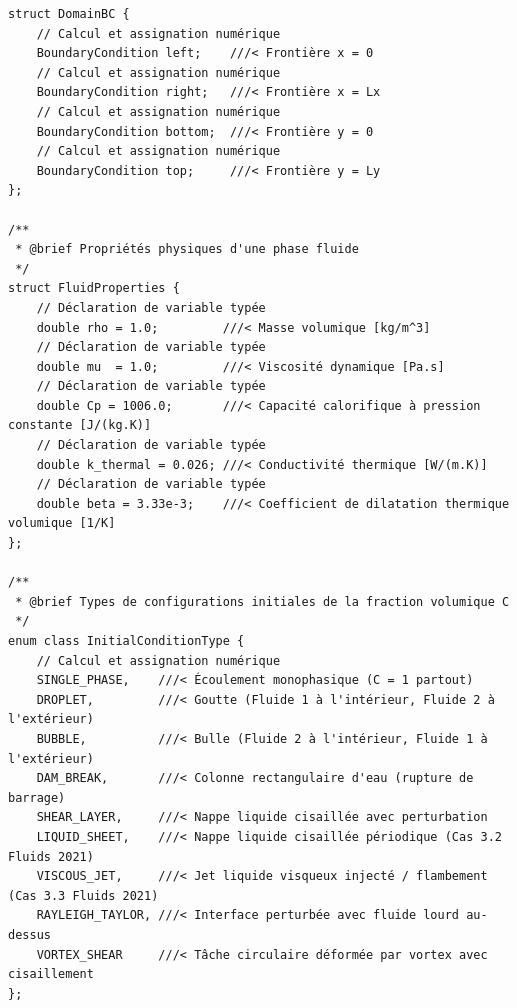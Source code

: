 \documentclass[10pt,a4paper,oneside]{book}
\begin{document}
\begin{lstlisting}[language={[11]C++}]
struct DomainBC {
    // Calcul et assignation numérique
    BoundaryCondition left;    ///< Frontière x = 0
    // Calcul et assignation numérique
    BoundaryCondition right;   ///< Frontière x = Lx
    // Calcul et assignation numérique
    BoundaryCondition bottom;  ///< Frontière y = 0
    // Calcul et assignation numérique
    BoundaryCondition top;     ///< Frontière y = Ly
};

/**
 * @brief Propriétés physiques d'une phase fluide
 */
struct FluidProperties {
    // Déclaration de variable typée
    double rho = 1.0;         ///< Masse volumique [kg/m^3]
    // Déclaration de variable typée
    double mu  = 1.0;         ///< Viscosité dynamique [Pa.s]
    // Déclaration de variable typée
    double Cp = 1006.0;       ///< Capacité calorifique à pression constante [J/(kg.K)]
    // Déclaration de variable typée
    double k_thermal = 0.026; ///< Conductivité thermique [W/(m.K)]
    // Déclaration de variable typée
    double beta = 3.33e-3;    ///< Coefficient de dilatation thermique volumique [1/K]
};

/**
 * @brief Types de configurations initiales de la fraction volumique C
 */
enum class InitialConditionType {
    // Calcul et assignation numérique
    SINGLE_PHASE,    ///< Écoulement monophasique (C = 1 partout)
    DROPLET,         ///< Goutte (Fluide 1 à l'intérieur, Fluide 2 à l'extérieur)
    BUBBLE,          ///< Bulle (Fluide 2 à l'intérieur, Fluide 1 à l'extérieur)
    DAM_BREAK,       ///< Colonne rectangulaire d'eau (rupture de barrage)
    SHEAR_LAYER,     ///< Nappe liquide cisaillée avec perturbation
    LIQUID_SHEET,    ///< Nappe liquide cisaillée périodique (Cas 3.2 Fluids 2021)
    VISCOUS_JET,     ///< Jet liquide visqueux injecté / flambement (Cas 3.3 Fluids 2021)
    RAYLEIGH_TAYLOR, ///< Interface perturbée avec fluide lourd au-dessus
    VORTEX_SHEAR     ///< Tâche circulaire déformée par vortex avec cisaillement
};


\end{lstlisting}
\end{document}
